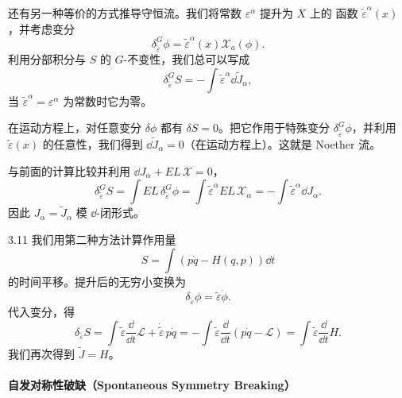 还有另一种等价的方式推导守恒流。我们将常数 $\varepsilon^{\alpha}$ 提升为 $X$ 上的
函数 $\tilde\varepsilon^{\alpha}(x)$，并考虑变分
\[
  \delta^{G}_{\tilde\varepsilon}\phi
  =\tilde\varepsilon^{\alpha}(x)\mathcal{X}_{a}(\phi).
\]
利用分部积分与 $S$ 的 $G$-不变性，我们总可以写成
\[
  \delta^{G}_{\tilde\varepsilon}S
  =-\int\tilde\varepsilon^{\alpha}\dd\tilde J_{\alpha},
\]
当 $\tilde\varepsilon^{\alpha}=\varepsilon^{\alpha}$ 为常数时它为零。

在运动方程上，对任意变分 $\delta\phi$ 都有 $\delta S=0$。把它作用于特殊变分
$\delta^{G}_{\tilde\varepsilon}\phi$，并利用 $\tilde\varepsilon(x)$ 的任意性，我们得到
$\dd\tilde J_{\alpha}=0$（在运动方程上）。这就是 Noether 流。

与前面的计算比较并利用 $\dd J_{\alpha}+EL\,\mathcal{X}=0$，
\[
  \delta^{G}_{\tilde\varepsilon}S
  =\int EL\,\delta^{G}_{\tilde\varepsilon}\phi
  =\int\tilde\varepsilon^{\alpha}EL\,\mathcal{X}_{\alpha}
  =-\int\tilde\varepsilon^{\alpha}\dd J_{\alpha}.
\]
因此 $J_{\alpha}=\tilde J_{\alpha}$ 模 $\dd$-闭形式。


\begin{wexam}{3.11}
  我们用第二种方法计算作用量
  \[
    S=\int\left(p\dot q-H(q,p)\right)\dd t
  \]
  的时间平移。提升后的无穷小变换为
  \[
    \delta_{\tilde\varepsilon}\phi=\tilde\varepsilon\dot\phi.
  \]
  代入变分，得
  \[
    \delta_{\tilde\varepsilon}S
    =\int\tilde\varepsilon\frac{\dd}{\dd t}\mathcal{L}
    +\dot{\tilde\varepsilon}\,p\dot q
    =-\int\tilde\varepsilon\frac{\dd}{\dd t}(p\dot q-\mathcal{L})
    =\int\tilde\varepsilon\frac{\dd}{\dd t}H.
  \]
  我们再次得到 $\tilde J=H$。
\end{wexam}


\paragraph{自发对称性破缺（Spontaneous Symmetry Breaking）}

